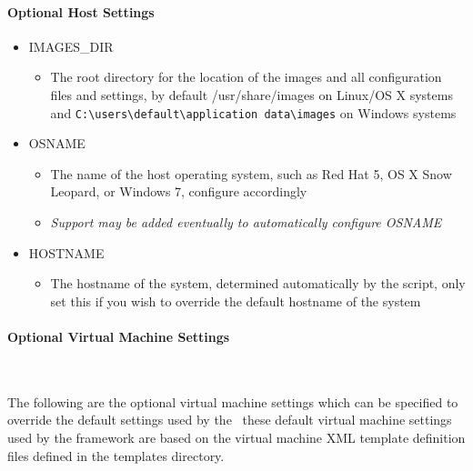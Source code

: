 \paragraph*{Optional Host Settings}
\begin{itemize}
\item	IMAGES\_DIR
		\begin{itemize}
		\item	The root directory for the location of the \cernvm images and all
				configuration files and settings, by default /usr/share/images on
				Linux/OS X systems and \verb|C:\users\default\application data\images|
				on Windows systems
		\end{itemize}
		
\item	OSNAME
		\begin{itemize}
		\item	The name of the host operating system, such as Red Hat 5, OS X
				Snow Leopard, or Windows 7, configure accordingly
		\item	\emph{Support may be added eventually to automatically configure OSNAME}
		\end{itemize}
		
\item	HOSTNAME
		\begin{itemize}
		\item	The hostname of the system, determined automatically by the script,
				only set this if you wish to override the default hostname of the
				system
		\end{itemize}
\end{itemize}


\paragraph*{Optional Virtual Machine Settings}~\newline

The following are the optional virtual machine settings which can be specified to override
the default settings used by the \cernvmtestframework\, these default virtual machine settings
used by the framework are based on the virtual machine XML template definition files defined
in the templates directory.
 

